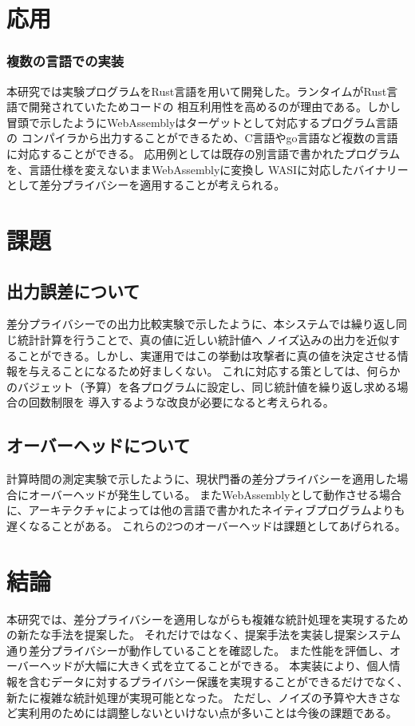 \documentclass[a4paper,11pt]{jreport}
\begin{document}
\chapter{応用}

\subsection{複数の言語での実装}

本研究では実験プログラムをRust言語を用いて開発した。ランタイムがRust言語で開発されていたためコードの
相互利用性を高めるのが理由である。しかし冒頭で示したようにWebAssemblyはターゲットとして対応するプログラム言語の
コンパイラから出力することができるため、C言語やgo言語など複数の言語に対応することができる。
応用例としては既存の別言語で書かれたプログラムを、言語仕様を変えないままWebAssemblyに変換し
WASIに対応したバイナリーとして差分プライバシーを適用することが考えられる。

\chapter{課題}

\section{出力誤差について}

差分プライバシーでの出力比較実験で示したように、本システムでは繰り返し同じ統計計算を行うことで、真の値に近しい統計値へ
ノイズ込みの出力を近似することができる。しかし、実運用ではこの挙動は攻撃者に真の値を決定させる情報を与えることになるため好ましくない。
これに対応する策としては、何らかのバジェット（予算）を各プログラムに設定し、同じ統計値を繰り返し求める場合の回数制限を
導入するような改良が必要になると考えられる。

\section{オーバーヘッドについて}

計算時間の測定実験で示したように、現状門番の差分プライバシーを適用した場合にオーバーヘッドが発生している。
またWebAssemblyとして動作させる場合に、アーキテクチャによっては他の言語で書かれたネイティブプログラムよりも遅くなることがある。
これらの2つのオーバーヘッドは課題としてあげられる。

\chapter{結論}
本研究では、差分プライバシーを適用しながらも複雑な統計処理を実現するための新たな手法を提案した。
それだけではなく、提案手法を実装し提案システム通り差分プライバシーが動作していることを確認した。
また性能を評価し、オーバーヘッドが大幅に大きく式を立てることができる。
本実装により、個人情報を含むデータに対するプライバシー保護を実現することができるだけでなく、
新たに複雑な統計処理が実現可能となった。
ただし、ノイズの予算や大きさなど実利用のためには調整しないといけない点が多いことは今後の課題である。
\end{document}
